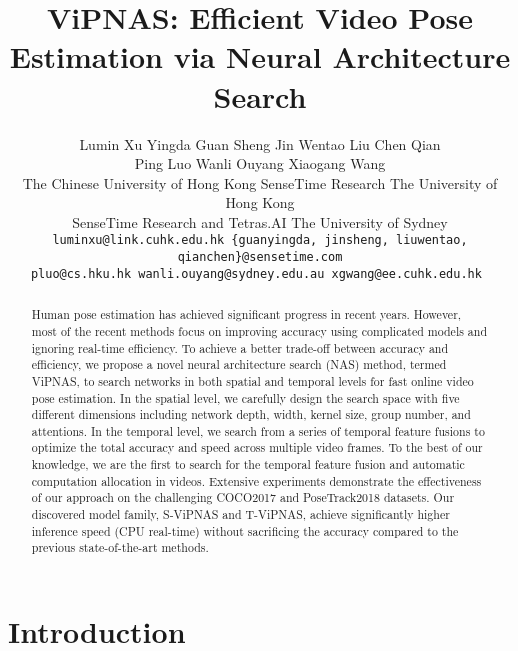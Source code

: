 \documentclass[final]{cvpr}
\begin{document}
\title{ViPNAS: Efficient Video Pose Estimation via Neural Architecture Search}

\author{Lumin Xu \quad Yingda Guan \quad Sheng Jin \quad Wentao Liu \quad Chen Qian \\ Ping Luo \quad Wanli Ouyang \quad Xiaogang Wang \\
 The Chinese University of Hong Kong \quad
 SenseTime Research \quad  The University of Hong Kong \\
 SenseTime Research and Tetras.AI \quad
 The University of Sydney \\
\tt\small luminxu@link.cuhk.edu.hk  \quad \{guanyingda, jinsheng, liuwentao, qianchen\}@sensetime.com \\
\tt\small pluo@cs.hku.hk    \quad wanli.ouyang@sydney.edu.au  \quad xgwang@ee.cuhk.edu.hk
}

\maketitle

\thispagestyle{empty}
\pagestyle{empty}

\begin{abstract}
   Human pose estimation has achieved significant progress in recent years. However, most of the recent methods focus on improving accuracy using complicated models and ignoring real-time efficiency. To achieve a better trade-off between accuracy and efficiency, we propose a novel neural architecture search (NAS) method, termed ViPNAS, to search networks in both spatial and temporal levels for fast online video pose estimation. In the spatial level, we carefully design the search space with five different dimensions including network depth, width, kernel size, group number, and attentions. In the temporal level, we search from a series of temporal feature fusions to optimize the total accuracy and speed across multiple video frames. To the best of our knowledge, we are the first to search for the temporal feature fusion and automatic computation allocation in videos. Extensive experiments demonstrate the effectiveness of our approach on the challenging COCO2017 and PoseTrack2018 datasets. Our discovered model family, S-ViPNAS and T-ViPNAS, achieve significantly higher inference speed (CPU real-time) without sacrificing the accuracy compared to the previous state-of-the-art methods.
\end{abstract}

\section{Introduction}
\end{document}
